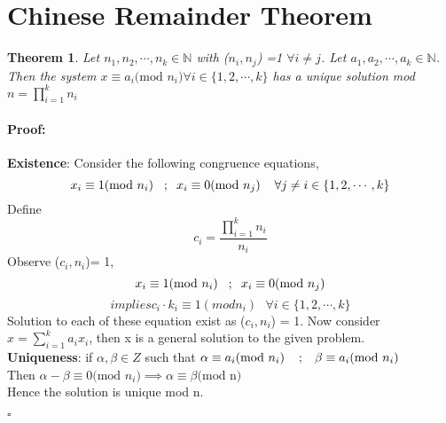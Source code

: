 \documentclass{report}
\newtheorem{theorem}{Theorem}[section]
\newcommand{\n}{\mathbb{N}}
\renewenvironment{proof}{\paragraph{Proof:}}{\hfill$\square$}
\begin{document}
\section{Chinese Remainder Theorem}
\begin{theorem}
    Let $n_1,n_2,\cdots , n_k \in \n $ with ($n_i,n_j$) =1 $\forall i\not= j$.  Let $a_1,a_2,\cdots , a_k \in \n $. Then the system $x\equiv a_i \textrm{(mod $n_i$)} \forall i \in \{ 1,2,\cdots,k\}$ has a unique solution mod $n = \prod_{i=1}^k n_i$
    
\end{theorem}
\begin{proof}
\textbf{Existence}:
    Consider the following congruence equations, 
    $$x_i \equiv 1 \textrm{(mod $n_i$)}\hspace{3mm};\hspace{2mm} x_i \equiv 0 (\textrm{mod $n_j)$}\hspace{4mm}  \forall j \not= i \in \{ 1,2,\cdots,k\}$$
    Define $$c_i = \frac{\prod_{i=1}^k n_i}{n_i}$$
    Observe ($c_i,n_i$)= 1,
    $$x_i \equiv 1 \textrm{(mod $n_i$)}\hspace{3mm};\hspace{2mm} x_i \equiv 0 (\textrm{mod $n_j)$}$$
    $$ implies c_i\cdot k_i \equiv 1 \textrm{$(mod n_i)$ } \forall i \in \{ 1,2,\cdots,k\} $$
    Solution to each of these equation exist as ($c_i,n_i$) = 1.    
    Now consider $x=\sum_{i=1}^k a_ix_i$, then x is a general solution to the given problem.   
\\
\textbf{Uniqueness}:
if $\alpha, \beta \in Z$ such that $\alpha \equiv a_i \textrm{(mod $n_i$)} \hspace{4mm} ; \hspace{3mm} \beta \equiv a_i \textrm{(mod $n_i$)} $
\\
Then $\alpha - \beta \equiv 0 \textrm{(mod $n_i$)} \implies \alpha \equiv \beta \textrm{(mod n)}$
\\
Hence the solution is unique mod n.

\end{proof}
\end{document}
